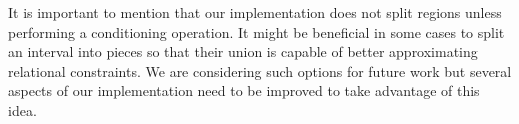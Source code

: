 It is important to mention that our implementation does not split
regions unless performing a conditioning operation. It might be
beneficial in some cases to split an interval into pieces so that
their union is capable of better approximating relational
constraints. We are considering such options for future work but
several aspects of our implementation need to be improved to take
advantage of this idea.

